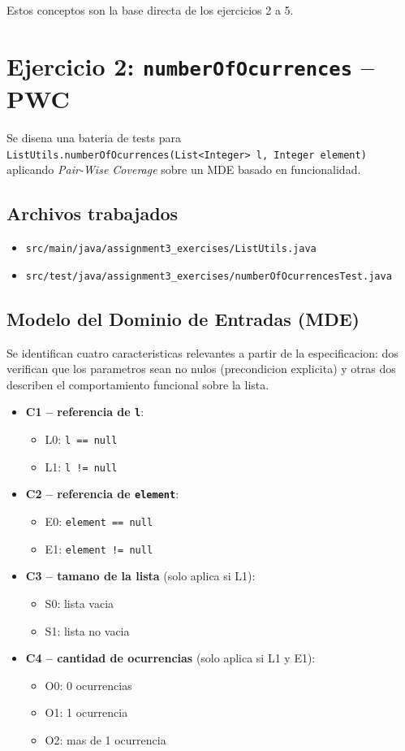 \documentclass[12pt,a4paper]{article}
\begin{document}
Estos conceptos son la base directa de los ejercicios 2 a 5.

\section{Ejercicio 2: \texttt{numberOfOcurrences} -- PWC}

Se disena una bateria de tests para
\texttt{ListUtils.numberOfOcurrences(List<Integer> l, Integer element)} aplicando
\textit{Pair-Wise Coverage} sobre un MDE basado en funcionalidad.

\subsection{Archivos trabajados}

\begin{itemize}
  \item \texttt{src/main/java/assignment3\_exercises/ListUtils.java}
  \item \texttt{src/test/java/assignment3\_exercises/numberOfOcurrencesTest.java}
\end{itemize}

\subsection{Modelo del Dominio de Entradas (MDE)}

Se identifican cuatro caracteristicas relevantes a partir de la especificacion: dos verifican que
los parametros sean no nulos (precondicion explicita) y otras dos describen el comportamiento
funcional sobre la lista.

\begin{itemize}
  \item \textbf{C1 -- referencia de \texttt{l}}:
  \begin{itemize}
    \item L0: \texttt{l == null}
    \item L1: \texttt{l != null}
  \end{itemize}
  \item \textbf{C2 -- referencia de \texttt{element}}:
  \begin{itemize}
    \item E0: \texttt{element == null}
    \item E1: \texttt{element != null}
  \end{itemize}
  \item \textbf{C3 -- tamano de la lista} (solo aplica si L1):
  \begin{itemize}
    \item S0: lista vacia
    \item S1: lista no vacia
  \end{itemize}
  \item \textbf{C4 -- cantidad de ocurrencias} (solo aplica si L1 y E1):
  \begin{itemize}
    \item O0: 0 ocurrencias
    \item O1: 1 ocurrencia
    \item O2: mas de 1 ocurrencia
  \end{itemize}
\end{itemize}
\end{document}
